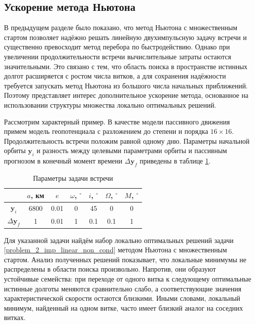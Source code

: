 
\subsection{Ускорение метода Ньютона}

В предыдущем разделе было показано, что метод Ньютона с множественным стартом позволяет надёжно решать линейную двухимпульсную задачу встречи и существенно превосходит метод перебора по быстродействию. Однако при увеличении продолжительности встречи вычислительные затраты остаются значительными. Это связано с тем, что область поиска в пространстве истинных долгот расширяется с ростом числа витков, а для сохранения надёжности требуется запускать метод Ньютона из большого числа начальных приближений. Поэтому представляет интерес дополнительное ускорение метода, основанное на использовании структуры множества локально оптимальных решений.

Рассмотрим характерный пример. В качестве модели пассивного движения примем модель геопотенциала с разложением до степени и порядка $16 \times 16$. Продолжительность встречи положим равной одному дню. Параметры начальной орбиты $\mathbf{y}_i$ и разность между целевыми параметрами орбиты и пассивным прогнозом в конечный момент времени $\Delta \mathbf{y}_f$ приведены в таблице \ref{tab::newton_acc_example}.

\begin{table}[h!]
\centering
\caption{Параметры задачи встречи}
\label{tab::newton_acc_example}
\renewcommand{\arraystretch}{1.25}
\begin{tabular}{|c|c|c|c|c|c|c|}
\hline
 & $a$, км & $e$ & $\omega$, $^\circ$ & $i$, $^\circ$ & $\Omega$, $^\circ$ & $M$, $^\circ$ \\
\hline
$\mathbf{y}_i$ 
& 6800 & 0.01 & 0 & 45 & 0 & 0 \\
\hline
$\Delta \mathbf{y}_f$
& 1 & 0.01 & 1 & 0.1 & 0.1 & 1 \\
\hline
\end{tabular}
\end{table}

Для указанной задачи найдём набор локально оптимальных решений задачи \eqref{problem_2_imp_linear_non_cond} методом Ньютона с множественным стартом. Анализ полученных решений показывает, что локальные минимумы не распределены в области поиска произвольно. Напротив, они образуют устойчивые семейства: при переходе от одного витка к следующему оптимальные истинные долготы меняются сравнительно слабо, а соответствующие значения характеристической скорости остаются близкими. Иными словами, локальный минимум, найденный на одном витке, часто имеет близкий аналог на соседних витках.

